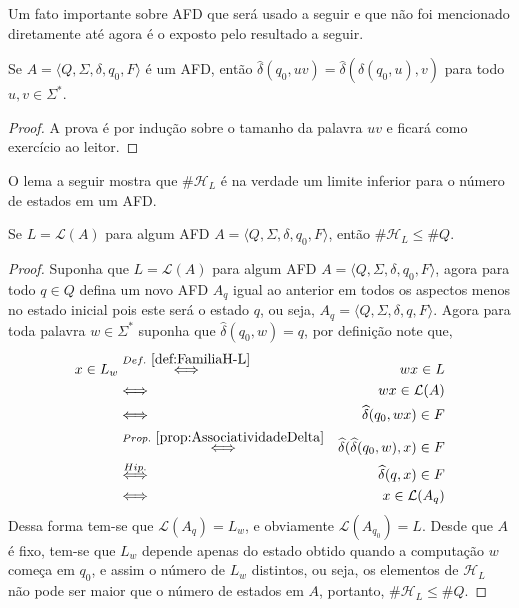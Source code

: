 Um fato importante sobre AFD que será usado a seguir e que não foi mencionado diretamente até agora é o exposto pelo resultado a seguir.

\begin{proposition}\label{prop:AssociatividadeDelta}
	Se $A = \langle Q, \Sigma, \delta, q_0, F\rangle$ é um AFD, então $\widehat{\delta}(q_0, uv) = \widehat{\delta}( \widehat{\delta}(q_0, u), v)$ para todo $u,v \in \Sigma^*$.
\end{proposition}

\begin{proof}
	A prova é por indução sobre o tamanho da palavra $uv$ e ficará como exercício ao leitor.
\end{proof}

O lema a seguir mostra que $\# \mathcal{H}_L$ é na verdade um limite inferior para o número de estados em um AFD. 

\begin{lemma}\label{lema:LimiteInferiorEstados}
	Se $L = \mathcal{L}(A)$ para algum AFD $A = \langle Q, \Sigma, \delta, q_0, F\rangle$, então $\# \mathcal{H}_L \leq \# Q$.
\end{lemma}

\begin{proof}
	Suponha que $L = \mathcal{L}(A)$ para algum AFD $A = \langle Q, \Sigma, \delta, q_0, F\rangle$, agora para todo $q \in Q$ defina um novo AFD $A_q$ igual ao anterior em todos os aspectos menos no estado inicial pois este será o estado $q$, ou seja,  $A_q = \langle Q, \Sigma, \delta, q, F\rangle$. Agora para toda palavra $w \in \Sigma^*$ suponha que $\widehat{\delta}(q_0, w) = q$, por definição note que, 
	\begin{eqnarray*}
		x \in L_w & \stackrel{Def. \ \ref{def:FamiliaH-L}}{\Longleftrightarrow} & wx \in L\\
		& \Longleftrightarrow & wx \in \mathcal{L}(A)\\
		& \Longleftrightarrow & \widehat{\delta}(q_0, wx) \in F\\
		& \stackrel{Prop. \ \ref{prop:AssociatividadeDelta}}{\Longleftrightarrow} & \widehat{\delta}(\widehat{\delta}(q_0, w), x) \in F\\
		& \stackrel{Hip.}{\Longleftrightarrow} & \widehat{\delta}(q, x) \in F\\
		& \Longleftrightarrow & x \in \mathcal{L}(A_q)
	\end{eqnarray*}
	Dessa forma tem-se que $\mathcal{L}(A_q) = L_w$, e obviamente $\mathcal{L}(A_{q_0}) = L$. Desde que  $A$ é fixo, tem-se que $L_w$ depende apenas do estado obtido quando a computação $w$ começa em $q_0$, e assim o número de $L_w$ distintos, ou seja, os elementos de $\mathcal{H}_L$ não pode ser maior que o número de estados em $A$, portanto, $\#\mathcal{H}_L \leq \# Q$.
\end{proof}

